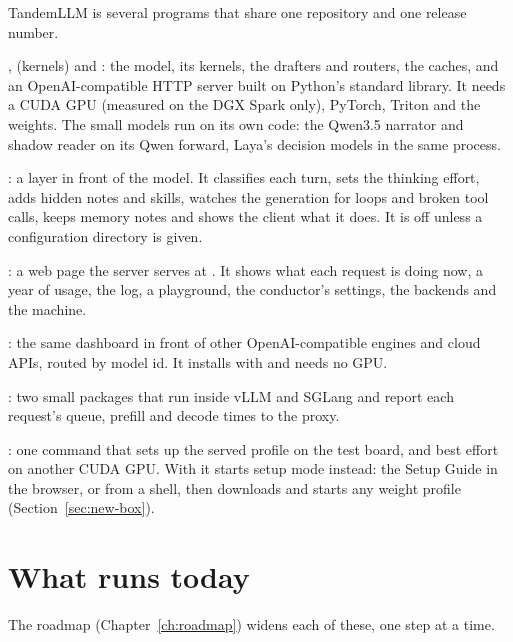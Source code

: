 TandemLLM is several programs that share one repository and one release number.

\begin{description}[style=nextline]
\item[The engine] ,  (kernels) and : the model, its kernels, the drafters and routers, the caches, and an OpenAI-compatible HTTP server built on Python's standard library. It needs a CUDA GPU (measured on the DGX Spark only), PyTorch, Triton and the weights. The small models run on its own code: the Qwen3.5 narrator and shadow reader on its Qwen forward, Laya's decision models in the same process.
\item[The conductor] : a layer in front of the model. It classifies each turn, sets the thinking effort, adds hidden notes and skills, watches the generation for loops and broken tool calls, keeps memory notes and shows the client what it does. It is off unless a configuration directory is given.
\item[The dashboard] : a web page the server serves at . It shows what each request is doing now, a year of usage, the log, a playground, the conductor's settings, the backends and the machine.
\item[The proxy] : the same dashboard in front of other OpenAI-compatible engines and cloud APIs, routed by model id. It installs with  and needs no GPU.
\item[The plugins] : two small packages that run inside vLLM and SGLang and report each request's queue, prefill and decode times to the proxy.
\item[The installer] : one command that sets up the served profile on the test board, and best effort on another CUDA GPU. With  it starts setup mode instead: the Setup Guide in the browser, or  from a shell, then downloads and starts any weight profile (Section~\ref{sec:new-box}).
\end{description}

\section{What runs today}

The roadmap (Chapter~\ref{ch:roadmap}) widens each of these, one step at a time.

